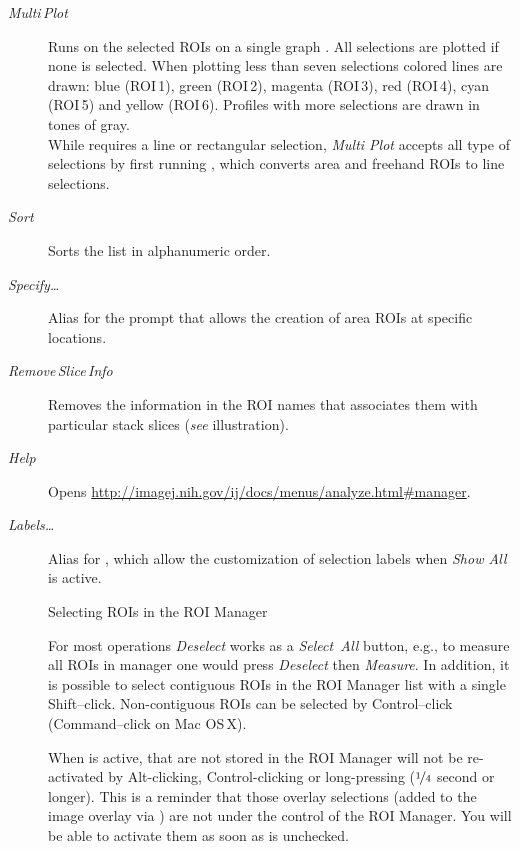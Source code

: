 \begin{description}
\item [{\emph{Multi\,Plot}}] \improvement{}Runs 
on the selected ROIs on a single graph \cite{C-RM-MultiPlot}. All
selections are plotted if none is selected. When plotting less than
seven selections colored lines are drawn: blue (ROI\,1), green (ROI\,2),
magenta (ROI\,3), red (ROI\,4), cyan (ROI\,5) and yellow (ROI\,6).
Profiles with more selections are drawn in tones of gray.\\
While 
requires a line or rectangular selection, \emph{Multi Plot} accepts
all type of selections by first running ,
which converts area and freehand ROIs to line selections.
\item [{\emph{Sort}}] Sorts the list in alphanumeric order.
\item [{\emph{Specify\ldots{}}}] Alias for the 
prompt that allows the creation of area ROIs at specific locations.
\item [{\emph{\label{misc:RM-RemoveSliceInfo}Remove\,Slice\,Info}}] Removes
the information in the ROI names that associates them with particular
stack slices (\emph{see}  illustration).
\item [{\emph{Help}}] Opens \href{http://imagej.nih.gov/ij/docs/menus/analyze.html\#manager}{http://imagej.nih.gov/ij/docs/menus/analyze.html\#{}manager}.
\item [{\emph{Labels\ldots{}}}] Alias for ,
which allow the customization of selection labels when \emph{Show
All} is active.
\begin{infobox}[h]
\caption{\label{infobox:ROIManager}Selecting ROIs in the ROI Manager}


\noindent For most  operations \emph{Deselect}
works as a \emph{Select~All }button, e.g., to measure all ROIs in
manager one would press \emph{Deselect} then \emph{Measure}. In addition,
it is possible to select contiguous ROIs in the ROI Manager list with
a single Shift--click. Non-contiguous ROIs can be selected by Control--click
(Command--click on Mac OS\,X).\medskip{}


When  is active, 
that are not stored in the ROI Manager will not be re-activated by
Alt-clicking, Control-clicking or long-pressing ($\nicefrac{1}{4}$
second or longer). This is a reminder that those overlay selections
(added to the image overlay via )
are not under the control of the ROI Manager. You will be able to
activate them as soon as  is unchecked.
\end{infobox}


\end{description}
